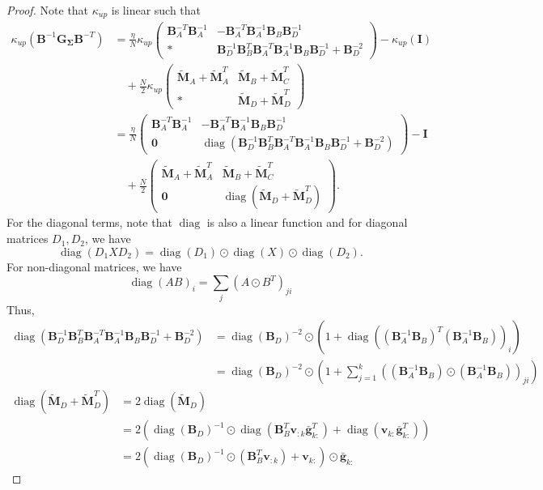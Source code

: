\documentclass[a4paper, 11pt, oneside]{scrartcl}
\theoremstyle{break}
\DeclareMathOperator{\diag}{diag}
\newcommand{\matr}[1]{\boldsymbol{#1}}
\numberwithin{equation}{section}
\begin{document}
\begin{proof}
						Note that $\kappa_{up}$ is linear such that
						\begin{align*}
							\kappa_{up}(\matr{B}^{-1} \matr{G_{\Sigma}} \matr{B}^{-T}) &= \frac{\eta}{N} \kappa_{up} \begin{pmatrix} \matr{B}_A^{-T} \matr{B}_A^{-1} & -\matr{B}_A^{-T} \matr{B}_A^{-1} \matr{B}_B \matr{B}_D^{-1} \\ * & \matr{B}_D^{-1} \matr{B}_B^T \matr{B}_A^{-T} \matr{B}_A^{-1} \matr{B}_B \matr{B}_D^{-1} + \matr{B}_D^{-2} \end{pmatrix} - \kappa_{up}(\matr{I}) \\
							&\quad + \frac{N}{2} \kappa_{up} \begin{pmatrix} \matr{\tilde{M}}_A + \matr{\tilde{M}}_A^T & \matr{\tilde{M}}_B + \matr{\tilde{M}}_C^T \\ * & \matr{\tilde{M}}_D + \matr{\tilde{M}}_D^T \end{pmatrix} \\
							&= \frac{\eta}{N} \begin{pmatrix} \matr{B}_A^{-T} \matr{B}_A^{-1} & -\matr{B}_A^{-T} \matr{B}_A^{-1} \matr{B}_B \matr{B}_D^{-1} \\ \matr{0} & \diag(\matr{B}_D^{-1} \matr{B}_B^T \matr{B}_A^{-T} \matr{B}_A^{-1} \matr{B}_B \matr{B}_D^{-1} + \matr{B}_D^{-2}) \end{pmatrix} - \matr{I} \\
							&\quad + \frac{N}{2} \begin{pmatrix} \matr{\tilde{M}}_A + \matr{\tilde{M}}_A^T & \matr{\tilde{M}}_B + \matr{\tilde{M}}_C^T \\ \matr{0} & \diag(\matr{\tilde{M}}_D + \matr{\tilde{M}}_D^T) \end{pmatrix}.
						\end{align*}
						For the diagonal terms, note that $\diag$ is also a linear function and for diagonal matrices $D_1, D_2$, we have
						$$\diag(D_1 X D_2) = \diag(D_1) \odot \diag(X) \odot \diag(D_2).$$
						For non-diagonal matrices, we have
						$$\diag(A B)_i = \sum_j (A \odot B^T)_{ji}$$
						Thus, 
						\begin{align*}
							\diag(\matr{B}_D^{-1} \matr{B}_B^T \matr{B}_A^{-T} \matr{B}_A^{-1} \matr{B}_B \matr{B}_D^{-1} + \matr{B}_D^{-2}) &= \diag(\matr{B}_D)^{-2} \odot (1 + \diag((\matr{B}_A^{-1} \matr{B}_B)^T (\matr{B}_A^{-1} \matr{B}_B))_i) \\
							&= \diag(\matr{B}_D)^{-2} \odot \left(1 + \sum_{j=1}^k ((\matr{B}_A^{-1} \matr{B}_B) \odot (\matr{B}_A^{-1} \matr{B}_B))_{ji} \right)
						\end{align*}
						\begin{align*}
							\diag(\matr{\tilde{M}}_D + \matr{\tilde{M}}_D^T) &= 2 \diag(\matr{\tilde{M}}_D) \\
							&= 2 (\diag(\matr{B}_D)^{-1} \odot \diag(\matr{B}_B^T \matr{v}_{:k} \matr{\bar{g}}_{k:}^T) + \diag(\matr{v}_{k:} \matr{\bar{g}}_{k:}^T)) \\
							&= 2 (\diag(\matr{B}_D)^{-1} \odot (\matr{B}_B^T \matr{v}_{:k}) + \matr{v}_{k:}) \odot \matr{\bar{g}}_{k:}
						\end{align*}
					\end{proof}
\end{document}

